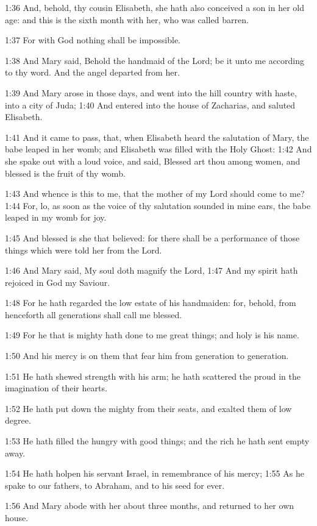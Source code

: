 1:36 And, behold, thy cousin Elisabeth, she hath also conceived a son in her old age: and this is the sixth month with her, who was called barren.

1:37 For with God nothing shall be impossible.

1:38 And Mary said, Behold the handmaid of the Lord; be it unto me according to thy word. And the angel departed from her.

1:39 And Mary arose in those days, and went into the hill country with haste, into a city of Juda; 1:40 And entered into the house of Zacharias, and saluted Elisabeth.

1:41 And it came to pass, that, when Elisabeth heard the salutation of Mary, the babe leaped in her womb; and Elisabeth was filled with the Holy Ghost: 1:42 And she spake out with a loud voice, and said, Blessed art thou among women, and blessed is the fruit of thy womb.

1:43 And whence is this to me, that the mother of my Lord should come to me?  1:44 For, lo, as soon as the voice of thy salutation sounded in mine ears, the babe leaped in my womb for joy.

1:45 And blessed is she that believed: for there shall be a performance of those things which were told her from the Lord.

1:46 And Mary said, My soul doth magnify the Lord, 1:47 And my spirit hath rejoiced in God my Saviour.

1:48 For he hath regarded the low estate of his handmaiden: for, behold, from henceforth all generations shall call me blessed.

1:49 For he that is mighty hath done to me great things; and holy is his name.

1:50 And his mercy is on them that fear him from generation to generation.

1:51 He hath shewed strength with his arm; he hath scattered the proud in the imagination of their hearts.

1:52 He hath put down the mighty from their seats, and exalted them of low degree.

1:53 He hath filled the hungry with good things; and the rich he hath sent empty away.

1:54 He hath holpen his servant Israel, in remembrance of his mercy; 1:55 As he spake to our fathers, to Abraham, and to his seed for ever.

1:56 And Mary abode with her about three months, and returned to her own house.

